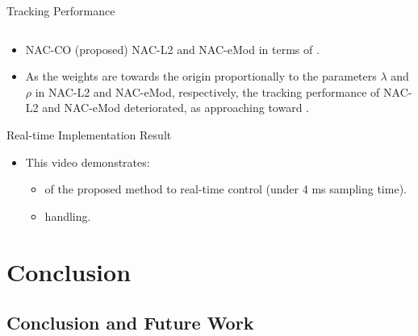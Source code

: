 \documentclass[8pt, aspectratio=169, handout]{beamer}
\newcommand{\ctxt}[2]{\color{#1}{#2}\color{black}}
\begin{document}
\begin{frame}{\insertsubsectionhead}{Tracking Performance}
\begin{columns}
  \end{columns}

  \begin{itemize}
    \item NAC-CO (proposed) \ctxt{airforceblue}{outperformed } NAC-L2 and NAC-eMod in terms of \ctxt{awesome}{tracking performance}.
    \item As the weights are \ctxt{awesome}{biased }towards the origin proportionally to the parameters $\lambda$ and $\rho$ in NAC-L2 and NAC-eMod, respectively, the tracking performance of NAC-L2 and NAC-eMod deteriorated, as approaching toward \ctxt{airforceblue}{suboptimal points}.
  \end{itemize}

\end{frame}

\begin{frame}{Real-time Implementation Result}

  \begin{itemize}
    \item This video demonstrates:
    \begin{itemize}
      \item \ctxt{airforceblue}{Applicability }of the proposed method to real-time control (under 4 ms sampling time).
      \item \ctxt{awesome}{Convex input constraints } handling.
    \end{itemize}
  \end{itemize}

  \centering

\end{frame}

\section{Conclusion}

\subsection{Conclusion and Future Work}
\end{document}

